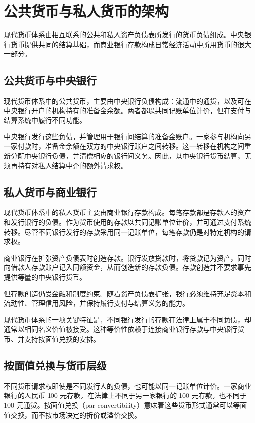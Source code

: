 \section{公共货币与私人货币的架构}
现代货币体系由相互联系的公共和私人资产负债表所发行的货币负债组成。中央银行货币提供共同的结算基础，而商业银行存款构成日常经济活动中所用货币的很大一部分。

\subsection{公共货币与中央银行}

现代货币体系中的公共货币，主要由中央银行负债构成：流通中的通货，以及可在中央银行开户的机构持有的准备金余额。两者都以共同记账单位计价，但在支付与结算系统中履行不同功能。

中央银行发行这些负债，并管理用于银行间结算的准备金账户。一家参与机构向另一家付款时，准备金余额在双方的中央银行账户之间转移。这一转移在机构之间重新分配中央银行负债，并清偿相应的银行间义务。因此，以中央银行货币结算，无须再持有对私人结算中介的额外请求权。

\subsection{私人货币与商业银行}

现代货币体系中的私人货币主要由商业银行存款构成。每笔存款都是存款人的资产和发行银行的负债。作为货币使用的存款以共同记账单位计价，并可通过支付系统转移。尽管不同银行发行的存款采用同一记账单位，每笔存款仍是对特定机构的请求权。

商业银行在扩张资产负债表时创造存款。银行发放贷款时，将贷款记为资产，同时向借款人存款账户记入同额资金，从而创造新的存款负债。存款创造并不要求事先提供等量的中央银行货币。

但存款创造仍受金融和制度约束。随着资产负债表扩张，银行必须维持充足资本和流动性、管理信用风险，并保持履行支付与结算义务的能力。

现代货币体系的一项关键特征是，不同银行发行的存款在法律上属于不同负债，却通常以相同名义价值被接受。这种等价性依赖于连接商业银行存款与中央银行货币、并支持按面值兑换的安排。

\subsection{按面值兑换与货币层级}

不同货币请求权即使是不同发行人的负债，也可能以同一记账单位计价。一家商业银行的人民币 100 元存款，在法律上不同于另一家银行的 100 元存款，也不同于 100 元通货。按面值兑换（par convertibility）意味着这些货币形式通常可以等面值交换，而不按市场决定的折价或溢价交换。

